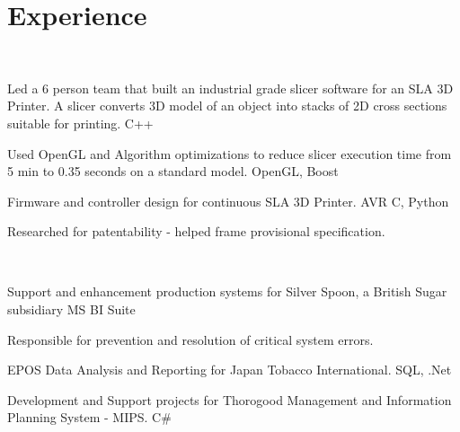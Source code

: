 \documentclass[]{deedy-resume-openfont}
\begin{document}
\begin{minipage}[t]{0.66\textwidth} 



\section{Experience}

\sectionsep

\\
\vspace{13pt}
\begin{tightemize}
\item  Led a 6 person team that built an industrial grade slicer software for an SLA 3D Printer. A slicer converts 3D model of an object into stacks of 2D cross sections suitable for printing. \hfill {
\selectfont 
C++
} 
\item Used OpenGL and Algorithm optimizations to reduce slicer execution time from 5 min to 0.35 seconds on a standard model. \hfill {
\selectfont 
OpenGL, Boost
}
\item Firmware and controller design for continuous SLA 3D Printer.\hfill {
\selectfont 
AVR C, Python
}
\item Researched for patentability - helped frame provisional specification.
\end{tightemize}

\sectionsep{}

\\
\vspace{\topsep} %
\begin{tightemize}
\item Support and enhancement production systems for Silver Spoon, a British Sugar subsidiary \hfill {
\selectfont MS BI Suite}
	\item Responsible for prevention and resolution of critical system errors.  
	\item EPOS Data Analysis and Reporting for Japan Tobacco International. \hfill{
\selectfont SQL, .Net}
	\item Development and Support projects for Thorogood Management and Information Planning System - MIPS. \hfill{ \selectfont C\#}
\end{tightemize}
\sectionsep


\end{minipage}
\end{document}
